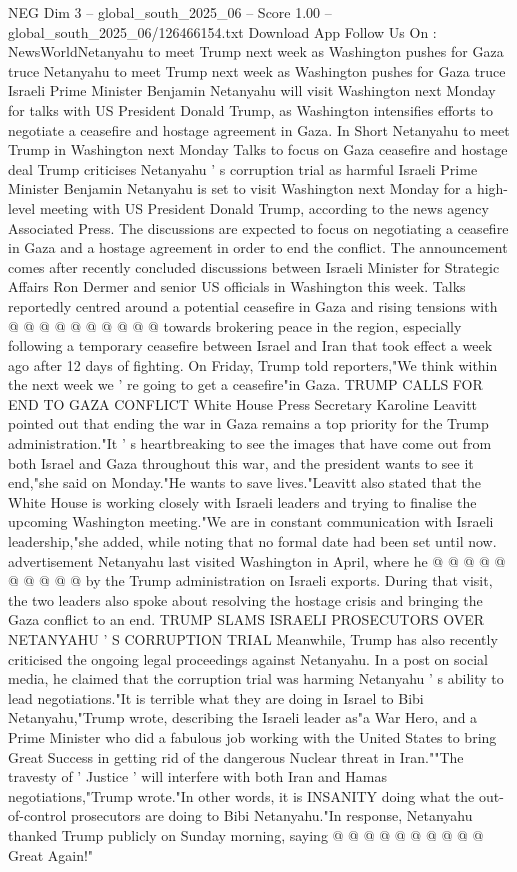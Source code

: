 \begin{textsample}{NEG Dim 3 – global\_south\_2025\_06 – Score 1.00 – global\_south\_2025\_06/126466154.txt}  \label{ex:f3_neg_254}
Download App Follow Us On : NewsWorldNetanyahu to meet Trump next week as Washington pushes for Gaza truce Netanyahu to meet Trump next week as Washington pushes for Gaza truce Israeli Prime Minister Benjamin Netanyahu will visit Washington next Monday for talks with US President Donald Trump, as Washington intensifies efforts to negotiate a ceasefire and hostage agreement in Gaza.
In Short Netanyahu to meet Trump in Washington next Monday Talks to focus on Gaza ceasefire and hostage deal Trump criticises Netanyahu ' s corruption trial as harmful Israeli Prime Minister Benjamin Netanyahu is set to visit Washington next Monday for a high-level meeting with US President Donald Trump, according to the news agency Associated Press.
The discussions are expected to focus on negotiating a ceasefire in Gaza and a hostage agreement in order to end the conflict.
The announcement comes after recently concluded discussions between Israeli Minister for Strategic Affairs Ron Dermer and senior US officials in Washington this week.
Talks reportedly centred around a potential ceasefire in Gaza and rising tensions with @ @ @ @ @ @ @ @ @ @ towards brokering peace in the region, especially following a temporary ceasefire between Israel and Iran that took effect a week ago after 12 days of fighting.
On Friday, Trump told reporters,"We think within the next week we ' re going to get a ceasefire"in Gaza.
TRUMP CALLS FOR END TO GAZA CONFLICT White House Press Secretary Karoline Leavitt pointed out that ending the war in Gaza remains a top priority for the Trump administration."It ' s heartbreaking to see the images that have come out from both Israel and Gaza throughout this war, and the president wants to see it end,"she said on Monday."He wants to save lives."Leavitt also stated that the White House is working closely with Israeli leaders and trying to finalise the upcoming Washington meeting."We are in constant communication with Israeli leadership,"she added, while noting that no formal date had been set until now. advertisement Netanyahu last visited Washington in April, where he @ @ @ @ @ @ @ @ @ @ by the Trump administration on Israeli exports.
During that visit, the two leaders also spoke about resolving the hostage crisis and bringing the Gaza conflict to an end.
TRUMP SLAMS ISRAELI PROSECUTORS OVER NETANYAHU ' S CORRUPTION TRIAL Meanwhile, Trump has also recently criticised the ongoing legal proceedings against Netanyahu.
In a post on social media, he claimed that the corruption trial was harming Netanyahu ' s ability to lead negotiations."It is terrible what they are doing in Israel to Bibi Netanyahu,"Trump wrote, describing the Israeli leader as"a War Hero, and a Prime Minister who did a fabulous job working with the United States to bring Great Success in getting rid of the dangerous Nuclear threat in Iran.""The travesty of ' Justice ' will interfere with both Iran and Hamas negotiations,"Trump wrote."In other words, it is INSANITY doing what the out-of-control prosecutors are doing to Bibi Netanyahu."In response, Netanyahu thanked Trump publicly on Sunday morning, saying @ @ @ @ @ @ @ @ @ @ Great Again!"

\end{textsample}
